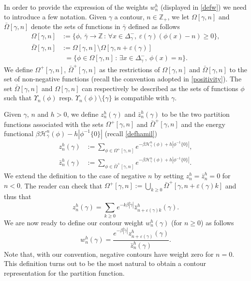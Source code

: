 \documentclass[JEP,XML,SOM,Unicode, NoFloatCountersInSection]{cedram}
\let\mathcal\mathscr
\newcommand{\sep}{\,:\,}
\numberwithin{equation}{section}
\theoremstyle{plain}
\theoremstyle{definition}
\newcommand{\cH}{{\ensuremath{\mathcal H}} }
\newcommand{\bbZ}{{\ensuremath{\mathbb Z}} }
\newcommand{\gb}{\beta}
\newcommand{\gep}{\varepsilon}
\newcommand{\gO}{\Omega}
\begin{document}
In order to provide the expression of the weights $w^h_n$ (displayed in \eqref{defw}) we need to introduce a few notation.
Given $\gamma$ a contour, $n\in \bbZ_+$, we let $\gO[\gamma,n]$ and $\bar \gO[\gamma,n]$ denote the sets of functions in $\bar \gamma$ defined as follows
\begin{equation}\label{defoom}
\begin{split}
\gO[\gamma,n]&:=\{\phi,\ \bar \gamma \rightarrow \bbZ \sep \forall x\in \Delta^-_{\gamma},\ \gep(\gamma)(\phi(x)-n)\ge 0\},\\
\bar \gO[\gamma,n]&:=\gO[\gamma,n]\setminus \gO[\gamma,n+\gep(\gamma)]\\
&\phantom{:}= \{ \phi \in \gO[\gamma,n] \sep \exists x\in \Delta^-_{\gamma},\ \phi(x)=n\}.
\end{split}
\end{equation}
We define $\gO^+[\gamma,n]$, $\bar \gO^+[\gamma,n]$ as the restrictions of $\gO[\gamma,n]$ and $\bar \gO[\gamma,n]$ to the set of non-negative functions
(recall the convention adopted in
\eqref{positivity}).
The set $\bar \gO[\gamma,n]$ and $\gO[\gamma,n]$ can respectively be described as the sets of functions
$\phi$ such that $\Upsilon_n(\phi)$ resp. $\Upsilon_n(\phi)\setminus \{\gamma\}$
is compatible with $\gamma$.

Given $\gamma$, $n$ and $h>0$, we define $z^{h}_n(\gamma)$ and $\bar z^h_n(\gamma)$
to be the two partition functions associated with the sets $\gO^+[\gamma,n]$ and $\bar \gO^+[\gamma,n]$ and the energy functional
$\gb \cH^n_{\bar \gamma}(\phi)-h|\phi^{-1}\{0\}|$ (recall \eqref{defhamil})
\begin{equation}\label{partisioux}\begin{split}
z^h_n(\gamma)&:= \sum_{\phi\in \gO^+[\gamma,n]} e^{-\gb \cH^n_{\bar \gamma}(\phi)+h |\phi^{-1}\{0\}|},\\
\bar z^h_n(\gamma)&:= \sum_{\phi\in \bar \gO^+[\gamma,n]} e^{-\gb \cH^n_{\bar \gamma}(\phi)+h|\phi^{-1}\{0\}|}.
\end{split}\end{equation}
We extend the definition to the case of negative $n$ by setting $z^h_n=\bar z^h_n=0$ for $n<0$.
The reader can check that $\gO^+[\gamma,n]:=\bigcup_{k\ge 0}\bar\gO^+[\gamma,n+\gep(\gamma)k]$ and thus that
\begin{equation}\label{relatz}
z^h_n(\gamma)= \sum_{k\ge 0} e^{-k \gb|\tilde \gamma|}\bar z^h_{n+\gep(\gamma)k}(\gamma).
\end{equation}
We are now ready to define our contour weight $w^h_n(\gamma)$ (for $n\ge 0$) as follows
\begin{equation}\label{defw}
w^h_n(\gamma)= \frac{ e^{-\gb|\tilde \gamma|} z^h_{n+\gep(\gamma)}(\gamma)}{\bar z^h_n(\gamma)}.
\end{equation}
Note that, with our convention, negative contours have weight zero for $n=0$.
This definition turns out to be the most natural to obtain a contour representation for the partition function.
\end{document}
